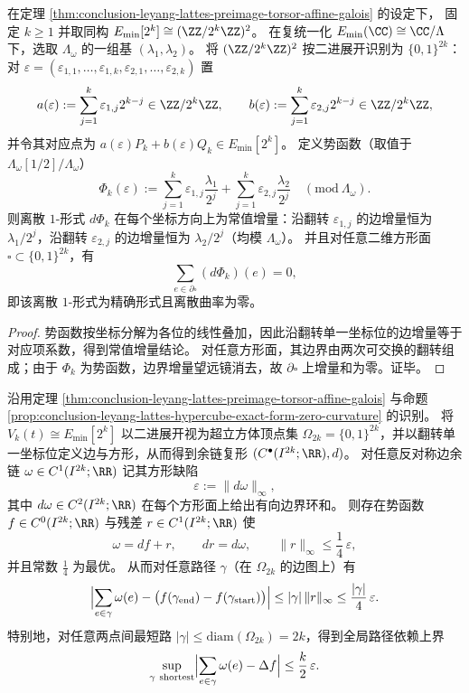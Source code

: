 \begin{proposition}\label{prop:conclusion-leyang-lattes-hypercube-exact-form-zero-curvature}
在定理 \ref{thm:conclusion-leyang-lattes-preimage-torsor-affine-galois} 的设定下，
固定 \(k\ge 1\) 并取同构 \(E_{\min}[2^k]\cong (\ZZ/2^k\ZZ)^2\)。
在复统一化 \(E_{\min}(\CC)\cong \CC/\Lambda\) 下，选取 \(\Lambda_\omega\) 的一组基 \((\lambda_1,\lambda_2)\)。
将 \((\ZZ/2^k\ZZ)^2\) 按二进展开识别为 \(\{0,1\}^{2k}\)：
对 \(\varepsilon=(\varepsilon_{1,1},\dots,\varepsilon_{1,k},\varepsilon_{2,1},\dots,\varepsilon_{2,k})\) 置
\[
a(\varepsilon):=\sum_{j=1}^k \varepsilon_{1,j}2^{k-j}\in\ZZ/2^k\ZZ,\qquad
b(\varepsilon):=\sum_{j=1}^k \varepsilon_{2,j}2^{k-j}\in\ZZ/2^k\ZZ,
\]
并令其对应点为 \(a(\varepsilon)P_k+b(\varepsilon)Q_k\in E_{\min}[2^k]\)。
定义势函数（取值于 \(\Lambda_\omega[1/2]/\Lambda_\omega\)）
\[
\Phi_k(\varepsilon)
:=\sum_{j=1}^k \varepsilon_{1,j}\frac{\lambda_1}{2^j}+\sum_{j=1}^k \varepsilon_{2,j}\frac{\lambda_2}{2^j}\quad(\mathrm{mod}\ \Lambda_\omega).
\]
则离散 \(1\)-形式 \(d\Phi_k\) 在每个坐标方向上为常值增量：沿翻转 \(\varepsilon_{1,j}\) 的边增量恒为 \(\lambda_1/2^j\)，沿翻转 \(\varepsilon_{2,j}\) 的边增量恒为 \(\lambda_2/2^j\)（均模 \(\Lambda_\omega\)）。
并且对任意二维方形面 \(\square\subset \{0,1\}^{2k}\)，有
\[
\sum_{e\in \partial\square}(d\Phi_k)(e)=0,
\]
即该离散 \(1\)-形式为精确形式且离散曲率为零。
\end{proposition}
\begin{proof}
势函数按坐标分解为各位的线性叠加，因此沿翻转单一坐标位的边增量等于对应项系数，得到常值增量结论。
对任意方形面，其边界由两次可交换的翻转组成；由于 \(\Phi_k\) 为势函数，边界增量望远镜消去，故 \(\partial\square\) 上增量和为零。证毕。
\end{proof}

\begin{corollary}\label{cor:conclusion-leyang-lattes-hypercube-optimal-defect-control}
沿用定理 \ref{thm:conclusion-leyang-lattes-preimage-torsor-affine-galois} 与命题 \ref{prop:conclusion-leyang-lattes-hypercube-exact-form-zero-curvature} 的识别。
将 \(V_k(t)\cong E_{\min}[2^k]\) 以二进展开视为超立方体顶点集 \(\Omega_{2k}=\{0,1\}^{2k}\)，并以翻转单一坐标位定义边与方形，从而得到余链复形 \((C^\bullet(I^{2k};\RR),d)\)。
对任意反对称边余链 \(\omega\in C^1(I^{2k};\RR)\) 记其方形缺陷
\[
\varepsilon:=\|d\omega\|_\infty,
\]
其中 \(d\omega\in C^2(I^{2k};\RR)\) 在每个方形面上给出有向边界环和。
则存在势函数 \(f\in C^0(I^{2k};\RR)\) 与残差 \(r\in C^1(I^{2k};\RR)\) 使
\[
\omega=df+r,\qquad dr=d\omega,\qquad \|r\|_\infty\le \frac14\,\varepsilon,
\]
并且常数 \(\frac14\) 为最优。
从而对任意路径 \(\gamma\)（在 \(\Omega_{2k}\) 的边图上）有
\[
\Bigl|\sum_{e\in\gamma}\omega(e)-\bigl(f(\gamma_{\mathrm{end}})-f(\gamma_{\mathrm{start}})\bigr)\Bigr|
\le |\gamma|\,\|r\|_\infty
\le \frac{|\gamma|}{4}\,\varepsilon.
\]
特别地，对任意两点间最短路 \(|\gamma|\le \mathrm{diam}(\Omega_{2k})=2k\)，得到全局路径依赖上界
\[
\sup_{\gamma\ \mathrm{shortest}}
\Bigl|\sum_{e\in\gamma}\omega(e)-\Delta f\Bigr|
\le \frac{k}{2}\,\varepsilon.
\]
\end{corollary}


